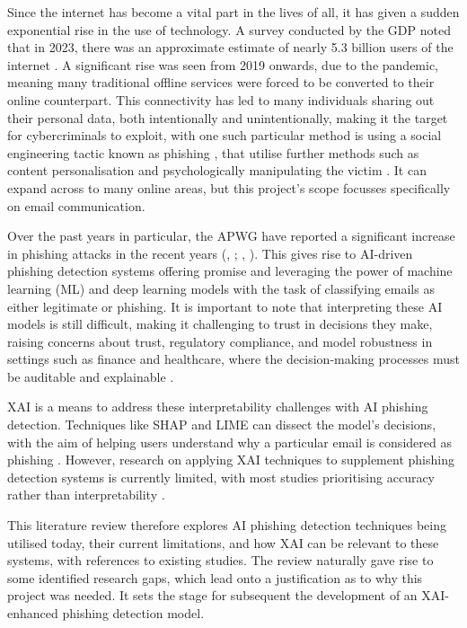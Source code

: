 
Since the internet has become a vital part in the lives of all, it has given a sudden exponential rise in the use of technology. A survey conducted by the GDP noted that in 2023, there was an approximate estimate of nearly 5.3 billion users of the internet \citep{kemp2022digital}. A significant rise was seen from 2019 onwards, due to the pandemic, meaning many traditional offline services were forced to be converted to their online counterpart. This connectivity has led to many individuals sharing out their personal data, both intentionally and unintentionally, making it the target for cybercriminals to exploit, with one such particular method is using a social engineering tactic known as phishing \citep{zahra2022detecting}, that utilise further methods such as content personalisation and psychologically manipulating the victim \citep{jagatic2007social}. It can expand across to many online areas, but this project's scope focusses specifically on email communication.\newline

\noindent Over the past years in particular, the APWG have reported a significant increase in phishing attacks in the recent years (\citeauthor{chirra2020ai}, \citeyear{chirra2020ai}; \citeauthor{syed2018ensuring}, \citeyear{syed2018ensuring}). This gives rise to AI-driven phishing detection systems offering promise and leveraging the power of machine learning (ML) and deep learning models with the task of classifying emails as either legitimate or phishing. It is important to note that interpreting these AI models is still difficult, making it challenging to trust in decisions they make, raising concerns about trust, regulatory compliance, and model robustness in settings such as finance and healthcare, where the decision-making processes must be auditable and explainable \citep{jain2022survey}.\newline

\noindent XAI is a means to address these interpretability challenges with AI phishing detection. Techniques like SHAP and LIME can dissect the model's decisions, with the aim of helping users understand why a particular email is considered as phishing \citep{lundberg2017unified}. However, research on applying XAI techniques to supplement phishing detection systems is currently limited, with most studies prioritising accuracy rather than interpretability \citep{ribeiro2016model}.\newline

\noindent This literature review therefore explores AI phishing detection techniques being utilised today, their current limitations, and how XAI can be relevant to these systems, with references to existing studies. The review naturally gave rise to some identified research gaps, which lead onto a justification as to why this project was needed. It sets the stage for subsequent the development of an XAI-enhanced phishing detection model.
